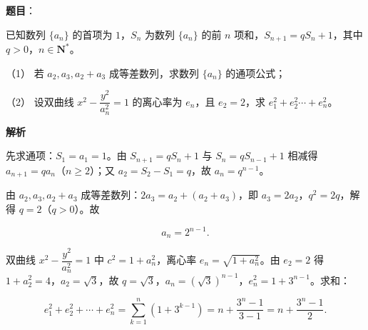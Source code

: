 \begin{answer}

\textbf{题目}：

已知数列 \(\{a_{n}\}\) 的首项为 \(1\)，\(S_{n}\) 为数列 \(\{a_{n}\}\) 的前 \(n\) 项和，\(S_{n+1}=qS_{n}+1\)，其中 \(q>0\)，\(n\in\mathbf{N}^{*}\)。

（1） 若 \(a_{2},a_{3},a_{2}+a_{3}\) 成等差数列，求数列 \(\{a_{n}\}\) 的通项公式；

（2） 设双曲线 \(x^{2}-\dfrac{y^{2}}{a_{n}^{2}}=1\) 的离心率为 \(e_{n}\)，且 \(e_{2}=2\)，求 \(e_{1}^{2}+e_{2}^{2}\cdots+e_{n}^{2}\)。

\textbf{解析}

先求通项：\(S_1=a_1=1\)。由 \(S_{n+1}=qS_n+1\) 与 \(S_n=qS_{n-1}+1\) 相减得 \(a_{n+1}=qa_n\)（\(n\geqslant2\)）；又 \(a_2=S_2-S_1=q\)，故 \(a_n=q^{n-1}\)。


由 \(a_2,a_3,a_2+a_3\) 成等差数列：\(2a_3=a_2+(a_2+a_3)\)，即 \(a_3=2a_2\)，\(q^{2}=2q\)，解得 \(q=2\)（\(q>0\)）。故

\nopagebreak[4]
\[
a_n=2^{n-1}.
\]


双曲线 \(x^{2}-\dfrac{y^{2}}{a_n^{2}}=1\) 中 \(c^{2}=1+a_n^{2}\)，离心率 \(e_n=\sqrt{1+a_n^{2}}\)。由 \(e_2=2\) 得 \(1+a_2^{2}=4\)，\(a_2=\sqrt{3}\)，故 \(q=\sqrt{3}\)，\(a_n=(\sqrt{3})^{n-1}\)，\(e_n^{2}=1+3^{n-1}\)。求和：

\nopagebreak[4]
\[
e_1^{2}+e_2^{2}+\cdots+e_n^{2}=\sum_{k=1}^{n}\left(1+3^{k-1}\right)
=n+\frac{3^{n}-1}{3-1}=n+\frac{3^{n}-1}{2}.
\]



\end{answer}
